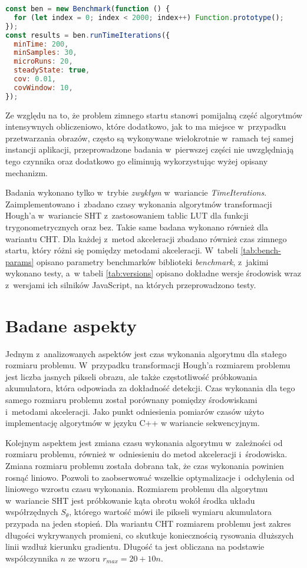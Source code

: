 \begin{lstlisting}[language=JavaScript, label=lst:benchmark-example, caption=Przykładowy benchmark mierzący czas wykonania funkcji \lstinline{Function.prototype()} 2000 razy.]
const ben = new Benchmark(function () {
  for (let index = 0; index < 2000; index++) Function.prototype();
});
const results = ben.runTimeIterations({
  minTime: 200,
  minSamples: 30,
  microRuns: 20,
  steadyState: true,
  cov: 0.01,
  covWindow: 10,
});
\end{lstlisting}


Ze względu na to, że problem zimnego startu stanowi pomijalną część algorytmów intensywnych obliczeniowo, które dodatkowo, jak to ma miejsce w~przypadku przetwarzania obrazów, często są wykonywane wielokrotnie w~ramach tej samej instancji aplikacji, przeprowadzone badania w~pierwszej części nie uwzględniają tego czynnika oraz dodatkowo go eliminują wykorzystując wyżej opisany mechanizm. 




Badania wykonano tylko w~trybie \textit{zwykłym} w~wariancie \textit{TimeIterations}. Zaimplementowano i~zbadano czasy wykonania algorytmów transformacji Hough'a w~wariancie SHT z~zastosowaniem tablic LUT dla funkcji trygonometrycznych oraz bez. Takie same badana wykonano również dla wariantu CHT. Dla każdej z~metod akceleracji zbadano również czas zimnego startu, który różni się pomiędzy metodami akceleracji. W~tabeli \ref{tab:bench-params} opisano parametry benchmarków biblioteki \textit{benchmark}, z~jakimi wykonano testy, a~w tabeli \ref{tab:versions} opisano dokładne wersje środowisk wraz z~wersjami ich silników JavaScript, na których przeprowadzono testy.


\section{Badane aspekty}

Jednym z~analizowanych aspektów jest czas wykonania algorytmu dla stałego rozmiaru problemu. W~przypadku transformacji Hough'a rozmiarem problemu jest liczba jasnych pikseli obrazu, ale także częstotliwość próbkowania akumulatora, która odpowiada za dokładność detekcji. Czas wykonania dla tego samego rozmiaru problemu został porównany pomiędzy środowiskami i~metodami akceleracji. Jako punkt odniesienia pomiarów czasów użyto implementację algorytmów w języku C++ w wariancie sekwencyjnym.

Kolejnym aspektem jest zmiana czasu wykonania algorytmu w~zależności od rozmiaru problemu, również w~odniesieniu do metod akceleracji i~środowiska. Zmiana rozmiaru problemu została dobrana tak, że czas wykonania powinien rosnąć liniowo. Pozwoli to zaobserwować wszelkie optymalizacje i~odchylenia od liniowego wzrostu czasu wykonania. Rozmiarem problemu dla algorytmu w~wariancie SHT jest próbkowanie kąta obrotu wokół środka układu współrzędnych $S_\theta$, którego wartość mówi ile pikseli wymiaru akumulatora przypada na jeden stopień. Dla wariantu CHT rozmiarem problemu jest zakres długości wykrywanych promieni, co skutkuje koniecznością rysowania dłuższych linii wzdłuż kierunku gradientu. Długość ta jest obliczana na podstawie współczynnika $n$ ze wzoru $r_{max}=20+10n$.

